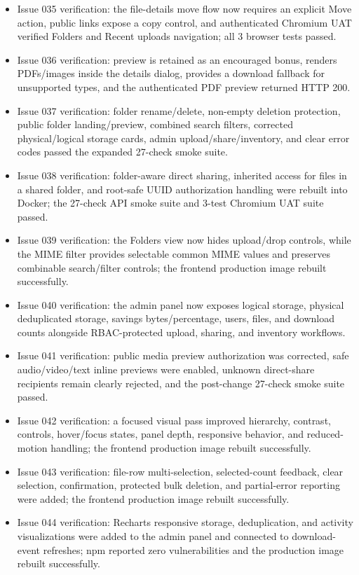 \documentclass[11pt,a4paper]{article}
\begin{document}
\begin{itemize}[leftmargin=*]
  \item Issue 035 verification: the file-details move flow now requires an explicit Move action, public links expose a copy control, and authenticated Chromium UAT verified Folders and Recent uploads navigation; all 3 browser tests passed.
  \item Issue 036 verification: preview is retained as an encouraged bonus, renders PDFs/images inside the details dialog, provides a download fallback for unsupported types, and the authenticated PDF preview returned HTTP 200.
  \item Issue 037 verification: folder rename/delete, non-empty deletion protection, public folder landing/preview, combined search filters, corrected physical/logical storage cards, admin upload/share/inventory, and clear error codes passed the expanded 27-check smoke suite.
  \item Issue 038 verification: folder-aware direct sharing, inherited access for files in a shared folder, and root-safe UUID authorization handling were rebuilt into Docker; the 27-check API smoke suite and 3-test Chromium UAT suite passed.
  \item Issue 039 verification: the Folders view now hides upload/drop controls, while the MIME filter provides selectable common MIME values and preserves combinable search/filter controls; the frontend production image rebuilt successfully.
  \item Issue 040 verification: the admin panel now exposes logical storage, physical deduplicated storage, savings bytes/percentage, users, files, and download counts alongside RBAC-protected upload, sharing, and inventory workflows.
  \item Issue 041 verification: public media preview authorization was corrected, safe audio/video/text inline previews were enabled, unknown direct-share recipients remain clearly rejected, and the post-change 27-check smoke suite passed.
  \item Issue 042 verification: a focused visual pass improved hierarchy, contrast, controls, hover/focus states, panel depth, responsive behavior, and reduced-motion handling; the frontend production image rebuilt successfully.
  \item Issue 043 verification: file-row multi-selection, selected-count feedback, clear selection, confirmation, protected bulk deletion, and partial-error reporting were added; the frontend production image rebuilt successfully.
  \item Issue 044 verification: Recharts responsive storage, deduplication, and activity visualizations were added to the admin panel and connected to download-event refreshes; npm reported zero vulnerabilities and the production image rebuilt successfully.

\end{itemize}
\end{document}
